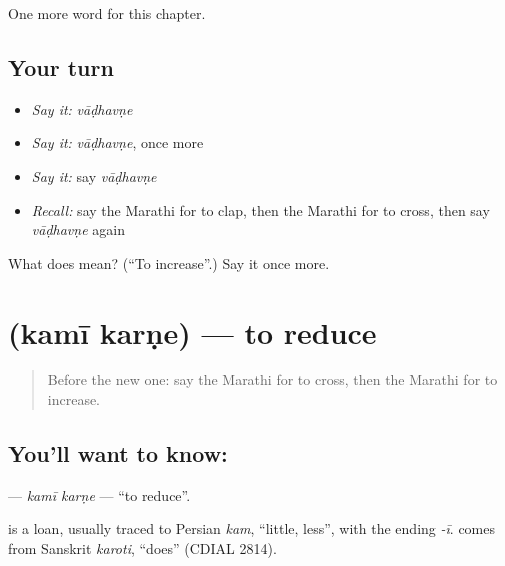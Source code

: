 \begin{grammarlens}[title={What you've built}]
One more word for this chapter.
\end{grammarlens}

\subsection*{Your turn}
\begin{itemize}
\raggedright
  \item \emph{Say it:} \emph{vāḍhavṇe}
  \item \emph{Say it:} \emph{vāḍhavṇe}, once more
  \item \emph{Say it:} say \emph{vāḍhavṇe}
  \item \emph{Recall:} say the Marathi for to clap, then the Marathi for to cross, then say \emph{vāḍhavṇe} again
\end{itemize}

\begin{tcolorbox}[breakable,colback=teal!4,colframe=teal!35!black,title={Before you move on}]
What does  mean? (\textquotedblleft{}To increase\textquotedblright{}.) Say it once more.
\end{tcolorbox}
\section[\texorpdfstring{\mr{कमी} \mr{करणे} (kamī karṇe)}{कमी करणे (kamī karṇe)}]{  (kamī karṇe) — to reduce}

\label{lesson:MR-C164-kami-karne}



\begin{quote}
Before the new one: say the Marathi for to cross, then the Marathi for to increase.
\end{quote}

\subsection*{You'll want to know:  }
\textbf{ } — \emph{kamī karṇe} — \textquotedblleft{}to reduce\textquotedblright{}.

\begin{cousinweb}
\textbf{} is a loan, usually traced to Persian \emph{kam}, \textquotedblleft{}little, less\textquotedblright{}, with the ending \emph{-ī}. \textbf{} comes from Sanskrit \emph{karoti}, \textquotedblleft{}does\textquotedblright{} (CDIAL 2814).
\end{cousinweb}

